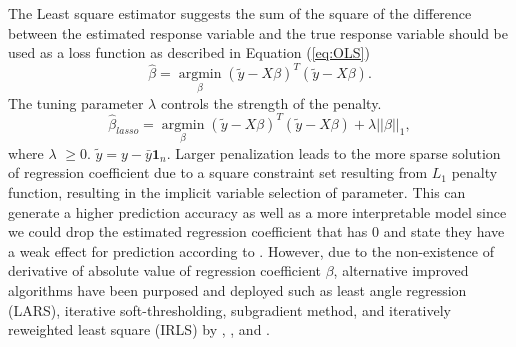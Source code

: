 The Least square estimator suggests the sum of the square of the difference between the estimated response variable and the true response variable should be used as a loss function as described in Equation (\ref{eq:OLS})
\begin{equation}
	\label{eq:OLS}
	\hat{\beta} = \underset{\beta}{\operatorname{argmin}}  (\tilde{y} - X\beta)^T(\tilde{y}-X\beta).
\end{equation}
The tuning parameter $\lambda$ controls the strength of the penalty.
\begin{equation}
	\label{eq:lasso1}
	\hat{\beta}_{lasso} = \underset{\beta}{\operatorname{argmin}} (\tilde{y}-X\beta)^T(\tilde{y}-X\beta) + \lambda ||\beta||_1,
\end{equation}
where $\lambda$ $\geq 0$. $\tilde{y} =  y - \bar{y}\textbf{1}_n$. Larger penalization leads to the more sparse solution of regression coefficient due to a square constraint set resulting from $L_1$ penalty function, resulting in the implicit variable selection of parameter. This can generate a higher prediction accuracy as well as a more interpretable model since we could drop the estimated regression coefficient that has 0 and state they have a weak effect for prediction according to \cite{tibshirani_1996}.
However, due to the non-existence of derivative of absolute value of regression coefficient $\beta$, alternative improved algorithms have been purposed and deployed such as least angle regression (LARS), iterative soft-thresholding, subgradient method, and iteratively reweighted least square (IRLS) by \cite{efron_hastie_johnstone_tibshirani_2004},   \cite{beck_teboulle_2009}, \cite{nan_zhang_shuqing_zeng_2005} and \cite{friedman_hastie_tibshirani_2010}.

